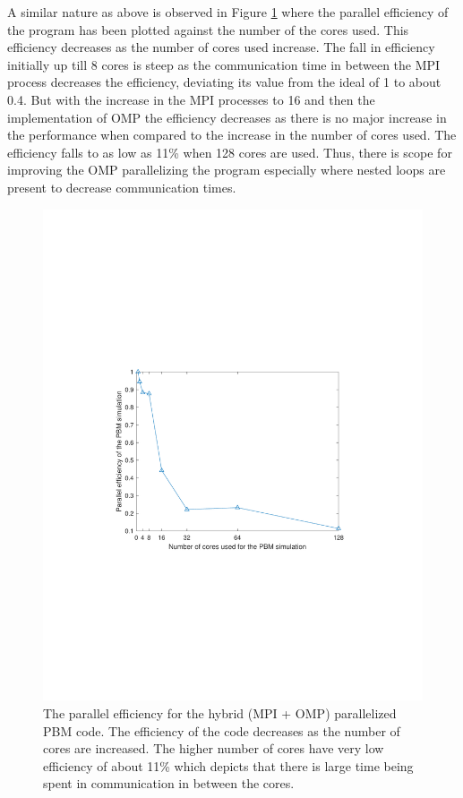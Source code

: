 \documentclass[preprint,11pt,authoryear]{elsarticle}
\begin{document}
A similar nature as above is observed in Figure \ref{fig:rslts_PBM_parallel_efficiency} where the parallel 
efficiency of the program has been plotted against the number of the cores used. This efficiency 
decreases as the number of cores used increase. The fall in efficiency initially up till 8 cores is steep as 
the communication time in between the MPI process decreases the efficiency, deviating its value from 
the ideal of 1 to about 0.4. But with the increase in the MPI processes to 16 and then the 
implementation of OMP the efficiency decreases as there is no major increase in the performance 
when compared to the increase in the number of cores used. The efficiency falls to as low as 11\% 
when 128 cores are used. Thus, there is scope for improving the OMP parallelizing the program 
especially where nested loops are present to decrease communication times.

\begin{figure}[H]
\centering
\includegraphics[scale=1]{rslsts_PBM_efficiency.pdf}
\caption{The parallel efficiency for the hybrid (MPI + OMP) parallelized PBM code. The efficiency of the 
code decreases as the number of cores are increased. The higher number of cores have very low 
efficiency of about 11\% which depicts that there is large time being spent in communication in 
between the cores.}
\label{fig:rslts_PBM_parallel_efficiency}
\end{figure}
\end{document}
